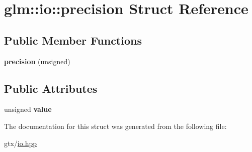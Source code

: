 \hypertarget{structglm_1_1io_1_1precision}{\section{glm\-:\-:io\-:\-:precision Struct Reference}
\label{structglm_1_1io_1_1precision}
}
\subsection*{Public Member Functions}
\begin{DoxyCompactItemize}
\item 
\hypertarget{structglm_1_1io_1_1precision_a308e66b3a687f5df22a1408636e71eb9}{{\bfseries precision} (unsigned)}\label{structglm_1_1io_1_1precision_a308e66b3a687f5df22a1408636e71eb9}

\end{DoxyCompactItemize}
\subsection*{Public Attributes}
\begin{DoxyCompactItemize}
\item 
\hypertarget{structglm_1_1io_1_1precision_a43da772dff9a209768c63f1220d52074}{unsigned {\bfseries value}}\label{structglm_1_1io_1_1precision_a43da772dff9a209768c63f1220d52074}

\end{DoxyCompactItemize}


The documentation for this struct was generated from the following file\-:\begin{DoxyCompactItemize}
\item 
gtx/\hyperlink{io_8hpp}{io.\-hpp}\end{DoxyCompactItemize}
